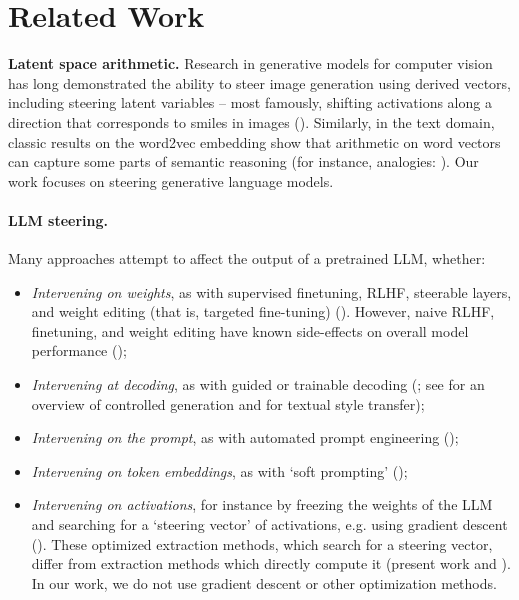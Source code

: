 \documentclass{article}
\theoremstyle{plain}
\theoremstyle{definition}
\theoremstyle{remark}
\begin{document}
\section{Related Work}


\textbf{Latent space arithmetic.}
Research in generative models for computer vision has long demonstrated the ability to steer image generation using derived vectors, including steering latent variables -- most famously, shifting activations along a direction that corresponds to smiles in images (\cite{larsen2016autoencoding,white2016sampling}). Similarly, in the text domain, classic results on the word2vec embedding show that arithmetic on word vectors can capture some parts of semantic reasoning (for instance, analogies: \cite{mikolov2013linguistic,NIPS2013_9aa42b31}). Our work focuses on steering generative language models.

\paragraph{LLM steering.} Many approaches attempt to affect the output of a pretrained LLM, whether:
\begin{itemize}[leftmargin=*]
    \item \textit{Intervening on weights}, as with supervised finetuning, RLHF, steerable layers, and weight editing (that is, targeted fine-tuning) (\cite{ranzato2016sequence,ziegler2020finetuning,dathathri2020plug,meng2023locating, ilharco2023editing}).
However, naive RLHF, finetuning, and weight editing have known side-effects on overall model performance (\cite{hase2023does,qi2023fine, brown2023robustness});
    \item \textit{Intervening at decoding}, as with guided or trainable decoding (\cite{gu-etal-2017-trainable,grover2019bias}; see \citealt{zhang2022survey} for an overview of controlled generation and \citealt{jin-etal-2022-deep} for textual style transfer);
    \item \textit{Intervening on the prompt}, as with automated prompt engineering (\cite{shin-etal-2020-autoprompt,zhou2022steering});
    \item \textit{Intervening on token embeddings}, as with `soft prompting' (\cite{li2021prefixtuning,lester2021power,khashabi-etal-2022-prompt});
    \item \textit{Intervening on activations}, for instance by freezing the weights of the LLM and searching for a `steering vector' of activations, e.g. using gradient descent (\cite{subramani-2022-extracting,hernandez2023inspecting}). These optimized extraction methods, which search for a steering vector, differ from 
    extraction methods which directly compute it (present work and \citealt{li2023inferencetime}). In our work, we do not use gradient descent or other optimization methods.
\end{itemize}
\end{document}
